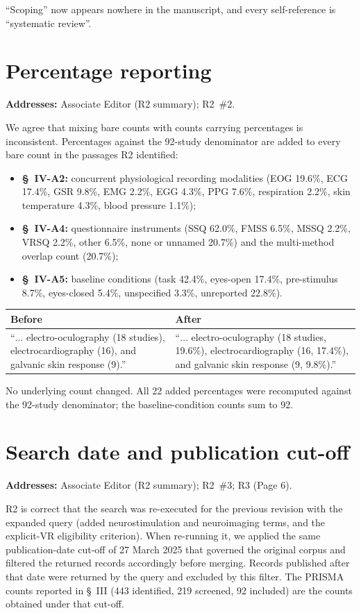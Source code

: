 \documentclass[11pt,a4paper]{article}
\makeatletter
\newcommand{\diffbox}[2]{%
  \begin{center}
  \small
  \begin{tabular}{@{}p{0.46\textwidth}@{\hspace{2em}}p{0.46\textwidth}@{}}
  \toprule
  \textbf{Before} & \textbf{After} \\
  \midrule
  #1 & #2 \\
  \bottomrule
  \end{tabular}
  \end{center}}
\newcommand{\addresses}[1]{\par\noindent\textbf{\small Addresses:} {\small #1}\par\smallskip}
\makeatother
\begin{document}
\noindent ``Scoping'' now appears nowhere in the manuscript, and every self-reference is ``systematic review''.

\section{Percentage reporting}\label{sec:pct}
\addresses{Associate Editor (R2 summary); R2~\#2.}

We agree that mixing bare counts with counts carrying percentages is inconsistent. Percentages against the 92-study denominator are added to every bare count in the passages R2 identified:

\begin{itemize}
  \item \textbf{\S~IV-A2:} concurrent physiological recording modalities (EOG 19.6\%, ECG 17.4\%, GSR 9.8\%, EMG 2.2\%, EGG 4.3\%, PPG 7.6\%, respiration 2.2\%, skin temperature 4.3\%, blood pressure 1.1\%);
  \item \textbf{\S~IV-A4:} questionnaire instruments (SSQ 62.0\%, FMSS 6.5\%, MSSQ 2.2\%, VRSQ 2.2\%, other 6.5\%, none or unnamed 20.7\%) and the multi-method overlap count (20.7\%);
  \item \textbf{\S~IV-A5:} baseline conditions (task 42.4\%, eyes-open 17.4\%, pre-stimulus 8.7\%, eyes-closed 5.4\%, unspecified 3.3\%, unreported 22.8\%).
\end{itemize}

\diffbox{``$\ldots$ electro-oculography (18 studies), electrocardiography (16), and galvanic skin response (9).''}{``$\ldots$ electro-oculography (18 studies, 19.6\%), electrocardiography (16, 17.4\%), and galvanic skin response (9, 9.8\%).''}

\noindent No underlying count changed. All 22 added percentages were recomputed against the 92-study denominator; the baseline-condition counts sum to 92.

\section{Search date and publication cut-off}\label{sec:date}
\addresses{Associate Editor (R2 summary); R2~\#3; R3 (Page 6).}

R2 is correct that the search was re-executed for the previous revision with the expanded query (added neurostimulation and neuroimaging terms, and the explicit-VR eligibility criterion). When re-running it, we applied the same publication-date cut-off of 27 March 2025 that governed the original corpus and filtered the returned records accordingly before merging. Records published after that date were returned by the query and excluded by this filter. The PRISMA counts reported in \S~III (443 identified, 219 screened, 92 included) are the counts obtained under that cut-off.
\end{document}
